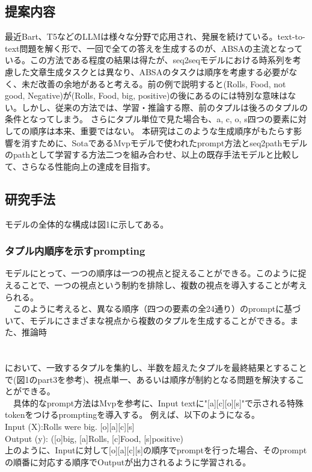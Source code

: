 \documentclass[a4j,10pt, twocolumn]{jarticle} \usepackage[dvipdfmx]{graphicx} \usepackage{amssymb} \usepackage{amsmath}
\begin{document}
\subsection{提案内容}
最近Bart、T5などのLLMは様々な分野で応用され、発展を続けている。text-to-text問題を解く形で、一回で全ての答えを生成するのが、ABSAの主流となっている\cite{zhang1}。この方法である程度の結果は得たが\cite{yan}、seq2seqモデルにおける時系列を考慮した文章生成タスクとは異なり、ABSAのタスクは順序を考慮する必要がなく、未だ改善の余地があると考える。前の例で説明すると(Rolls, Food, not good, Negative)が(Rolls, Food, big, positive)の後にあるのには特別な意味はない。しかし、従来の方法では、学習・推論する際、前のタプルは後ろのタプルの条件となってしまう。
さらにタプル単位で見た場合も、a, c, o, s四つの要素に対しての順序は本来、重要ではない。
 本研究はこのような生成順序がもたらす影響を消すために、SotaであるMvpモデル\cite{mvp}で使われたprompt方法とseq2pathモデル\cite{seq2path}のpathとして学習する方法二つを組み合わせ、以上の既存手法モデルと比較して、さらなる性能向上の達成を目指す。

\subsection{研究手法}
モデルの全体的な構成は図1に示してある。
\subsubsection{タプル内順序を示すprompting}
モデルにとって、一つの順序は一つの視点と捉えることができる。このように捉えることで、一つの視点という制約を排除し、複数の視点を導入することが考えられる。\\
　このように考えると、異なる順序（四つの要素の全24通り）のpromptに基づいて、モデルにさまざまな視点から複数のタプルを生成することができる。また、推論時\\
\vspace{7cm}
\\
\\において、一致するタプルを集約し、半数を超えたタプルを最終結果とすることで(図1のpart3を参考)、視点単一、あるいは順序が制約となる問題を解決することができる。\\
　具体的なprompt方法はMvpを参考に、Input textに"[a][c][o][s]"で示される特殊tokenをつけるpromptingを導入する。
例えば、以下のようになる。\\
Input (X):Rolls were big. [o][a][c][s]\\
Output (y): ([o]big, [a]Rolls, [c]Food, [s]positive) \\
上のように、Inputに対して[o][a][c][s]の順序でpromptを行った場合、そのpromptの順番に対応する順序でOutputが出力されるように学習される。
\end{document}
